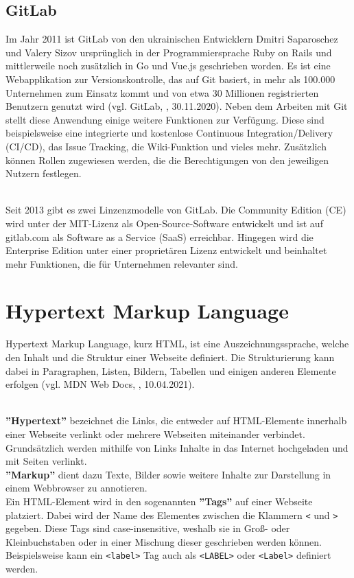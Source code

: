\subsection{GitLab}
Im Jahr 2011 ist GitLab von den ukrainischen Entwicklern Dmitri Saparoschez und Valery Sizov ursprünglich in der Programmiersprache Ruby on Rails und mittlerweile noch zusätzlich in Go und Vue.js geschrieben worden. Es ist eine Webapplikation zur Versionskontrolle, das auf Git basiert, in mehr als 100.000 Unternehmen zum Einsatz kommt und von etwa 30 Millionen registrierten Benutzern genutzt wird (vgl. GitLab, \cite{gitlab_2020}, 30.11.2020). Neben dem Arbeiten mit Git stellt diese Anwendung einige weitere Funktionen zur Verfügung. Diese sind beispielsweise eine integrierte und kostenlose Continuous Integration/Delivery (CI/CD), das Issue Tracking, die Wiki-Funktion und vieles mehr. Zusätzlich können Rollen zugewiesen werden, die die Berechtigungen von den jeweiligen Nutzern festlegen.

\mbox{}\\Seit 2013 gibt es zwei Linzenzmodelle von GitLab. Die Community Edition (CE) wird unter der MIT-Lizenz als Open-Source-Software entwickelt und ist auf gitlab.com als Software as a Service (SaaS) erreichbar. Hingegen wird die Enterprise Edition unter einer proprietären Lizenz entwickelt und beinhaltet mehr Funktionen, die für Unternehmen relevanter sind.

\section{Hypertext Markup Language}
Hypertext Markup Language, kurz HTML, ist eine Auszeichnungssprache, welche den Inhalt und die Struktur einer Webseite definiert. Die Strukturierung kann dabei in Paragraphen, Listen, Bildern, Tabellen und einigen anderen Elemente erfolgen (vgl. MDN Web Docs, \cite{html_2021}, 10.04.2021). 

\mbox{}\\
\textbf{''Hypertext''} bezeichnet die Links, die entweder auf HTML-Elemente innerhalb einer Webseite verlinkt oder mehrere Webseiten miteinander verbindet. Grundsätzlich werden mithilfe von Links Inhalte in das Internet hochgeladen und mit Seiten verlinkt.\\
\textbf{''Markup''} dient dazu Texte, Bilder sowie weitere Inhalte zur Darstellung in einem Webbrowser zu annotieren.\\
Ein HTML-Element wird in den sogenannten \textbf{''Tags''} auf einer Webseite platziert. Dabei wird der Name des Elementes zwischen die Klammern \texttt{<} und \texttt{>} gegeben. Diese Tags sind case-insensitive, weshalb sie in Groß- oder Kleinbuchstaben oder in einer Mischung dieser geschrieben werden können. Beispielsweise kann ein \texttt{<label>} Tag auch als \texttt{<LABEL>} oder \texttt{<Label>} definiert werden.

